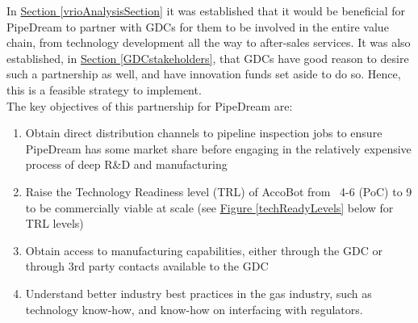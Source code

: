 \documentclass[11pt]{article}		%
\newcommand{\figref}[1]{\hyperref[#1]{Figure \ref*{#1}}}    %
\newcommand{\sectref}[1]{\hyperref[#1]{Section \ref*{#1}}}     %
\begin{document}
    	In \sectref{vrioAnalysisSection} it was established that it would be beneficial for PipeDream to partner with GDCs for them to be involved in the entire value chain, from technology development all the way to after-sales services. It was also established, in \sectref{GDCstakeholders}, that GDCs have good reason to desire such a partnership as well, and have innovation funds set aside to do so. Hence, this is a feasible strategy to implement.
    	\\ 
	    \hspace*{2ex}The key objectives of this partnership for PipeDream are:
        \begin{enumerate}
        \item Obtain direct distribution channels to pipeline inspection jobs to ensure PipeDream has some market share before engaging in the relatively expensive process of deep R\&D and manufacturing
        \item Raise the Technology Readiness level (TRL) of AccoBot from ~4-6 (PoC) to 9 to be commercially viable at scale (see \figref{techReadyLevels} below for TRL levels)
        \item Obtain access to manufacturing capabilities, either through the GDC or through 3rd party contacts available to the GDC
        \item Understand better industry best practices in the gas industry, such as technology know-how, and know-how on interfacing with regulators. 
        \end{enumerate}
\end{document}
